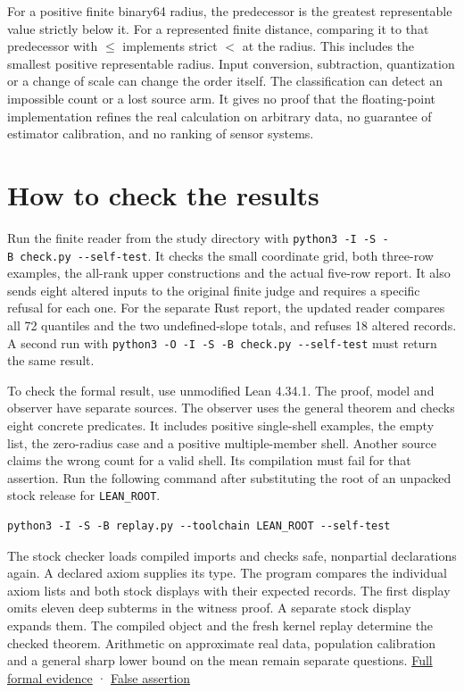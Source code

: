 For a positive finite binary64 radius, the predecessor is the greatest representable value strictly below it. For a represented finite distance, comparing it to that predecessor with \(\le\) implements strict \(<\) at the radius. This includes the smallest positive representable radius. Input conversion, subtraction, quantization or a change of scale can change the order itself. The classification can detect an impossible count or a lost source arm. It gives no proof that the floating-point implementation refines the real calculation on arbitrary data, no guarantee of estimator calibration, and no ranking of sensor systems.

\clearpage

\section{How to check the results}\label{how-to-check-the-results}

Run the finite reader from the study directory with \texttt{python3\ -I\ -S\ -B\ check.py\ -\/-self-test}. It checks the small coordinate grid, both three-row examples, the all-rank upper constructions and the actual five-row report. It also sends eight altered inputs to the original finite judge and requires a specific refusal for each one. For the separate Rust report, the updated reader compares all 72 quantiles and the two undefined-slope totals, and refuses 18 altered records. A second run with \texttt{python3\ -O\ -I\ -S\ -B\ check.py\ -\/-self-test} must return the same result.

To check the formal result, use unmodified Lean 4.34.1. The proof, model and observer have separate sources. The observer uses the general theorem and checks eight concrete predicates. It includes positive single-shell examples, the empty list, the zero-radius case and a positive multiple-member shell. Another source claims the wrong count for a valid shell. Its compilation must fail for that assertion. Run the following command after substituting the root of an unpacked stock release for \texttt{LEAN\_ROOT}.

\begin{verbatim}
python3 -I -S -B replay.py --toolchain LEAN_ROOT --self-test
\end{verbatim}

The stock checker loads compiled imports and checks safe, nonpartial declarations again. A declared axiom supplies its type. The program compares the individual axiom lists and both stock displays with their expected records. The first display omits eleven deep subterms in the witness proof. A separate stock display expands them. The compiled object and the fresh kernel replay determine the checked theorem. Arithmetic on approximate real data, population calibration and a general sharp lower bound on the mean remain separate questions. \href{https://github.com/sepahead/pid-rs/blob/main/audit/research/strict-neighbour-count-geometry/EVIDENCE.md}{Full formal evidence} · \href{https://github.com/sepahead/pid-rs/blob/main/audit/research/strict-neighbour-count-geometry/lean/Contradiction.lean}{False assertion}


